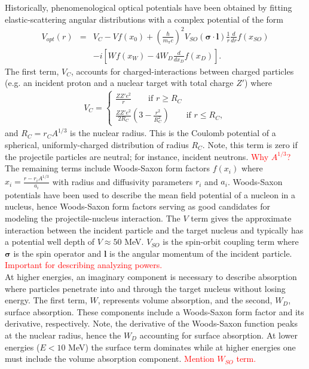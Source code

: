\documentclass[preprintnumbers,floatfix,aps,prc,preprint,nofootinbib]{revtex4-1}
\begin{document}
Historically, phenomenological optical potentials have been obtained by fitting elastic-scattering angular distributions with a complex potential of the form
%
\begin{eqnarray}
	\label{eq:phenomenological_optical_potential}
	V_{opt}(r) &=& V_C - V f(x_0) + (\frac{\hbar}{m_{\pi} c})^2 V_{SO}(\bm{\sigma} \cdot \textbf{l}) \frac{1}{r} \frac{d}{dr} f(x_{SO}) \nonumber \\ 
& &- i [W f(x_W) - 4 W_D \frac{d}{dx_D} f(x_D)].
\end{eqnarray}
%
The first term, $V_C$, accounts for charged-interactions between charged particles (e.g. an incident proton and a nuclear target with total charge $Z'$) where
%
\begin{eqnarray}
	\label{eq:coulomb_potential}
	V_C =
	\begin{cases}
		\frac{Z Z' e^2}{r} \qquad \text{if $r \geq R_C$} \\
		\frac{Z Z' e^2}{2 R_C} (3 - \frac{r^2}{R_C^2}) \qquad \text{if $r \leq R_C$},
	\end{cases}
\end{eqnarray}
%
and $R_C = r_C A^{1/3}$ is the nuclear radius. This is the Coulomb potential of a spherical, uniformly-charged distribution of radius $R_C$. Note, this term is zero if the projectile particles are neutral; for instance, incident neutrons. \textcolor{red}{Why $A^{1/3}$?}
\\

The remaining terms include Woods-Saxon form factors $f(x_i)$ where $x_i = \frac{r-r_i A^{1/3}}{a_i}$ with radius and diffusivity parameters $r_i$ and $a_i$. Woods-Saxon potentials have been used to describe the mean field potential of a nucleon in a nucleus, hence Woods-Saxon form factors serving as good candidates for modeling the projectile-nucleus interaction. The $V$ term gives the approximate interaction between the incident particle and the target nucleus and typically has a potential well depth of $V \approx 50$ MeV. $V_{SO}$ is the spin-orbit coupling term where $\bm{\sigma}$ is the spin operator and $\bm{l}$ is the angular momentum of the incident particle. \textcolor{red}{Important for describing analyzing powers.}
\\

At higher energies, an imaginary component is necessary to describe absorption where particles penetrate into and through the target nucleus without losing energy. The first term, $W$, represents volume absorption, and the second, $W_D$, surface absorption. These components include a Woods-Saxon form factor and its derivative, respectively. Note, the derivative of the Woods-Saxon function peaks at the nuclear radius, hence the $W_D$ accounting for surface absorption. At lower energies ($E < 10$ MeV) the surface term dominates while at higher energies one must include the volume absorption component. \textcolor{red}{Mention $W_{SO}$ term.}
\\
\end{document}
